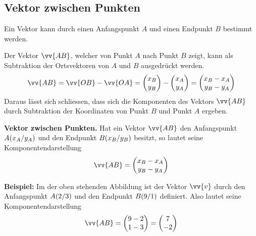 \subsection{Vektor zwischen Punkten}

Ein Vektor kann durch einen Anfangspunkt $A$ und einen Endpunkt $B$ bestimmt werden.
\begin{center}
\end{center}
Der Vektor $\vv{AB}$, welcher von Punkt $A$ nach Punkt $B$ zeigt, kann als Subtraktion der Ortsvektoren von $A$ und $B$ ausgedrückt werden.
\[
  \vv{AB} = \vv{OB} - \vv{OA} = \vxy{x_{B},y_{B}} - \vxy{x_{A},y_{A}} = \vxy{x_{B}-x_{A},y_{B}-y_{A}}
\]
Daraus lässt sich schliessen, dass sich die Komponenten des Vektors $\vv{AB}$ durch Subtraktion der Koordinaten von Punkt $B$ und Punkt $A$ ergeben.
\begin{theorem}
  \textbf{Vektor zwischen Punkten.} Hat ein Vektor $\vv{AB}$ den Anfangspunkt $\pxy[A]{x_{A},y_{A}}$ und den Endpunkt $\pxy[B]{x_{B},y_{B}}$ besitzt, so lautet seine Komponentendarstellung
  \[
    \vv{AB} = \vxy{x_{B}-x_{A},y_{B}-y_{A}}
  \]
\end{theorem}
\begin{example}
  \textbf{Beispiel:} Im der oben stehenden Abbildung ist der Vektor $\vv{v}$ durch den Anfangspunkt $\pxy[A]{2,3}$ und den Endpunkt $\pxy[B]{9,1}$ definiert. Also lautet seine Komponentendarstellung
  \[
    \vv{AB} = \vxy{9-2,1-3} = \vxy{7,-2}
  \]
\end{example}
